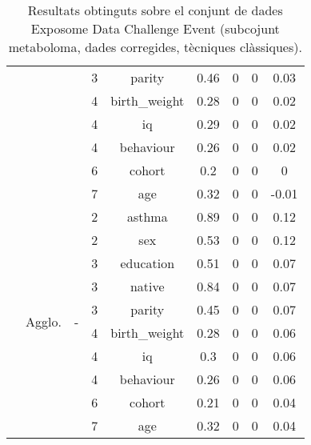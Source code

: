 \documentclass[CAT,BIB]{TFUOC}%
\begin{document}
\begin{table}
\begin{tabular}{@{}ccccccccc@{}}
            &  &  & 3 & parity & 0.46 & 0 & 0 & 0.03 \\
            &  &  & 4 & birth\_weight & 0.28 & 0 & 0 & 0.02 \\
            &  &  & 4 & iq & 0.29 & 0 & 0 & 0.02 \\
            &  &  & 4 & behaviour & 0.26 & 0 & 0 & 0.02 \\
            &  &  & 6 & cohort & 0.2 & 0 & 0 & 0 \\
            &  &  & 7 & age & 0.32 & 0 & 0 & -0.01 \\ \cmidrule(l){2-9}
            & \multirow{10}{*}{Agglo.} & \multirow{10}{*}{-} & 2 & asthma & 0.89 & 0 & 0 & 0.12 \\
            &  &  & 2 & sex & 0.53 & 0 & 0 & 0.12 \\
            &  &  & 3 & education & 0.51 & 0 & 0 & 0.07 \\
            &  &  & 3 & native & 0.84 & 0 & 0 & 0.07 \\
            &  &  & 3 & parity & 0.45 & 0 & 0 & 0.07 \\
            &  &  & 4 & birth\_weight & 0.28 & 0 & 0 & 0.06 \\
            &  &  & 4 & iq & 0.3 & 0 & 0 & 0.06 \\
            &  &  & 4 & behaviour & 0.26 & 0 & 0 & 0.06 \\
            &  &  & 6 & cohort & 0.21 & 0 & 0 & 0.04 \\
            &  &  & 7 & age & 0.32 & 0 & 0 & 0.04 \\ \bottomrule
        \end{tabular}
        \caption[Exposome Data Challenge Event: resultats - part 5]{
            Resultats obtinguts sobre el conjunt de dades Exposome Data Challenge Event
            (subcojunt metaboloma, dades corregides, tècniques clàssiques).
        }
        \label{t:results_exposome5}
    \end{table}
\end{document}
